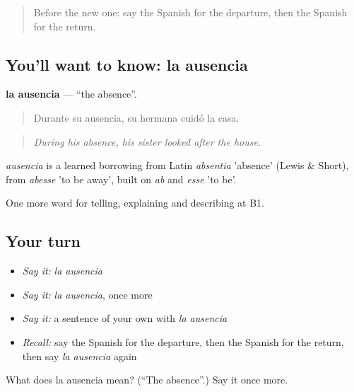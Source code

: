 \label{lesson:ES-C561-ausencia}



\begin{quote}
Before the new one: say the Spanish for the departure, then the Spanish for the return.
\end{quote}

\subsection*{You'll want to know: la ausencia}
\textbf{la ausencia} — \textquotedblleft{}the absence\textquotedblright{}.

\begin{quote}
Durante su ausencia, su hermana cuidó la casa.
\end{quote}

\begin{quote}
\emph{During his absence, his sister looked after the house.}
\end{quote}

\begin{cousinweb}
\emph{ausencia} is a learned borrowing from Latin \emph{absentia} 'absence' (Lewis \& Short), from \emph{abesse} 'to be away', built on \emph{ab} and \emph{esse} 'to be'.
\end{cousinweb}

\begin{grammarlens}[title={What you've built}]
One more word for telling, explaining and describing at B1.
\end{grammarlens}

\subsection*{Your turn}
\begin{itemize}
\raggedright
  \item \emph{Say it:} \emph{la ausencia}
  \item \emph{Say it:} \emph{la ausencia}, once more
  \item \emph{Say it:} a sentence of your own with \emph{la ausencia}
  \item \emph{Recall:} say the Spanish for the departure, then the Spanish for the return, then say \emph{la ausencia} again
\end{itemize}

\begin{tcolorbox}[breakable,colback=teal!4,colframe=teal!35!black,title={Before you move on}]
What does la ausencia mean? (\textquotedblleft{}The absence\textquotedblright{}.) Say it once more.
\end{tcolorbox}
